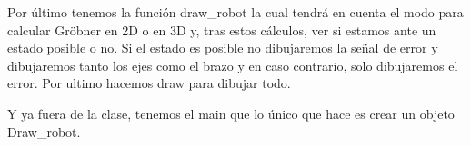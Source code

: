 Por último tenemos la función draw\_robot la cual tendrá en cuenta el modo para calcular Gröbner en 2D o en 3D y, tras estos cálculos, ver si estamos ante un estado posible o no. Si el estado es posible no dibujaremos la señal de error y dibujaremos tanto los ejes como el brazo y en caso contrario, solo dibujaremos el error.
Por ultimo hacemos draw para dibujar todo. 



Y ya fuera de la clase, tenemos el main que lo único que hace es crear un objeto Draw\_robot. 


